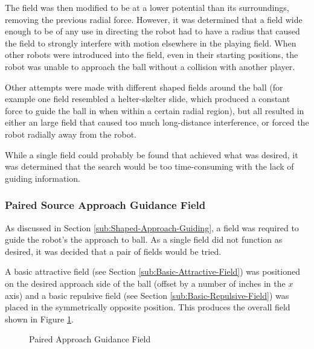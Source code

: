 \documentclass[10pt]{article}
\begin{document}
The field was then modified to be at a lower potential than its surroundings,
removing the previous radial force. However, it was determined that a field wide
enough to be of any use in directing the robot had to have a radius that caused
the field to strongly interfere with motion elsewhere in the playing field. When
other robots were introduced into the field, even in their starting positions,
the robot was unable to approach the ball without a collision with another
player.

Other attempts were made with different shaped fields around the ball (for
example one field resembled a helter-skelter slide, which produced a constant
force to guide the ball in when within a certain radial region), but all
resulted in either an large field that caused too much long-distance
interference, or forced the robot radially away from the robot.

While a single field could probably be found that achieved what was desired, it
was determined that the search would be too time-consuming with the lack of
guiding information.

\subsubsection{Paired Source Approach Guidance Field\label{sub:paired-field}}

As discussed in Section \ref{sub:Shaped-Approach-Guiding}, a field was required
to guide the robot's the approach to ball. As a single field did not function as
desired, it was decided that a pair of fields would be tried.

A basic attractive field (see Section \ref{sub:Basic-Attractive-Field}) was
positioned on the desired approach side of the ball (offset by a number of
inches in the $x$ axis) and a basic repulsive field (see Section
\ref{sub:Basic-Repulsive-Field}) was placed in the symmetrically opposite
position. This produces the overall field shown in Figure
\ref{fig:pairedApproachField}.

\begin{figure}
 \centering
 \caption{Paired Approach Guidance Field}
 \label{fig:pairedApproachField}
\end{figure}
\end{document}
